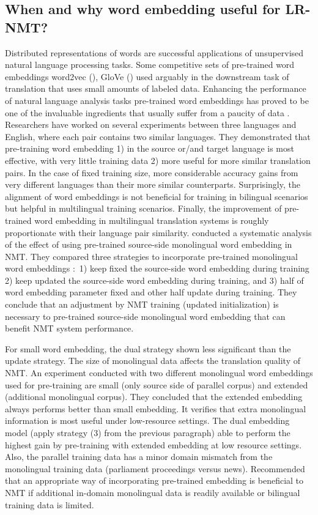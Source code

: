\documentclass[manuscript,screen]{acmart}
\begin{document}
\subsection{When and why word embedding useful for LR-NMT?}
Distributed representations of words are successful applications of unsupervised natural language processing tasks. Some competitive sets of pre-trained word embeddings word2vec (\citet{mikolov2013distributed}), GloVe (\citet{pennington2014glove}) used arguably in the downstream task of translation that uses small amounts of labeled data. Enhancing the performance of natural language analysis tasks pre-trained word embeddings has proved to be one of the invaluable ingredients that usually suffer from a paucity of data \citet{qi2018and}. Researchers have worked on several experiments between three languages and English, where each pair contains two similar languages. They demonstrated that pre-training word embedding 1) in the source or/and target language is most effective, with very little training data 2) more useful for more similar translation pairs. In the case of fixed training size, more considerable accuracy gains from very different languages than their more similar counterparts.
Surprisingly, the alignment of word embeddings is not beneficial for training in bilingual scenarios but helpful in multilingual training scenarios. Finally, the improvement of pre-trained word embedding in multilingual translation systems is roughly proportionate with their language pair similarity. \citet{ding2018source} conducted a systematic analysis of the effect of using pre-trained source-side monolingual word embedding in NMT. They compared three strategies to incorporate pre-trained monolingual word embeddings $\colon$ 1) keep fixed the source-side word embedding during training 2) keep updated the source-side word embedding during training, and 3) half of word embedding parameter fixed and other half update during training.
They conclude that an adjustment by NMT training (updated initialization) is necessary to pre-trained source-side monolingual word embedding that can benefit NMT system performance. 

For small word embedding, the dual strategy shown less significant than the update strategy. The size of monolingual data affects the translation quality of NMT. An experiment conducted with two different monolingual word embeddings used for pre-training are small (only source side of parallel corpus) and extended (additional monolingual corpus). They concluded that the extended embedding always performs better than small embedding. It verifies that extra monolingual information is most useful under low-resource settings. The dual embedding model (apply strategy (3) from the previous paragraph) able to perform the highest gain by pre-training with extended embedding at low resource settings. Also, the parallel training data has a minor domain mismatch from the monolingual training data (parliament proceedings versus news). Recommended that an appropriate way of incorporating pre-trained embedding is beneficial to NMT if additional in-domain monolingual data is readily available or bilingual training data is limited.
\end{document}
